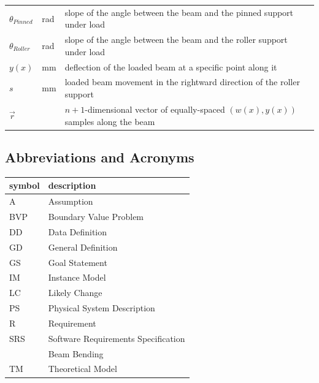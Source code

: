 \documentclass[12pt]{article}
\begin{document}
\begin{longtable*}{l l p{12cm}}
    \(\theta{}_{\mathit{Pinned}}\) & \si{\radian} & slope of the angle between the beam and the pinned support under load \\
    \(\theta{}_{\mathit{Roller}}\) & \si{\radian} & slope of the angle between the beam and the roller support under load \\
    \(y(x)\) & \si{\milli\metre} & deflection of the loaded beam at a specific point along it \\
    \(s\) & \si{\milli\metre} & loaded beam movement in the rightward direction of the roller support \\
    \(\vec{r}\) & \textemdash{} & $n+1$-dimensional vector of equally-spaced $(w(x),y(x))$ samples along the beam \\
    \bottomrule
\end{longtable*}

\subsection{Abbreviations and Acronyms}

\renewcommand{\arraystretch}{1.2}

\begin{center}
    \begin{tabular}{l l}
        \toprule
        \textbf{symbol} & \textbf{description}                \\
        \midrule
        A               & Assumption                          \\
        BVP             & Boundary Value Problem              \\
        DD              & Data Definition                     \\
        GD              & General Definition                  \\
        GS              & Goal Statement                      \\
        IM              & Instance Model                      \\
        LC              & Likely Change                       \\
        PS              & Physical System Description         \\
        R               & Requirement                         \\
        SRS             & Software Requirements Specification \\
        \progname{}     & Beam Bending                        \\
        TM              & Theoretical Model                   \\
        \bottomrule
    \end{tabular}
\end{center}
\end{document}
